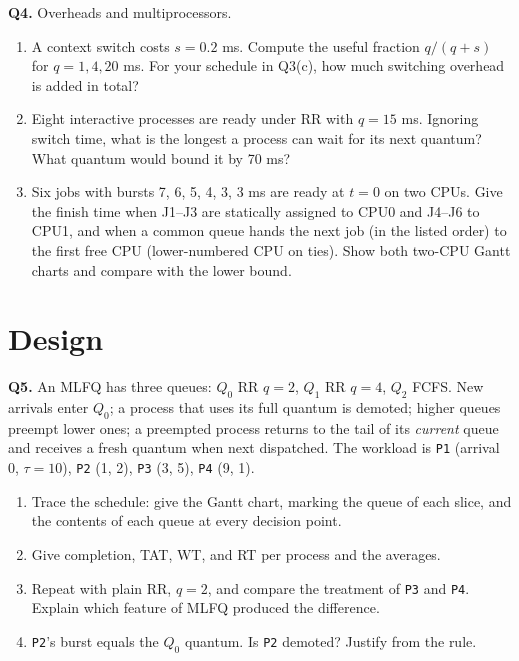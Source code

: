 \documentclass[11pt]{article}
\begin{document}
\textbf{Q4.} Overheads and multiprocessors.
\begin{enumerate}
  \item[(a)] A context switch costs $s = 0.2$ ms. Compute the useful fraction $q/(q+s)$ for $q = 1, 4, 20$ ms. For your schedule in Q3(c), how much switching overhead is added in total?
  \item[(b)] Eight interactive processes are ready under RR with $q = 15$ ms. Ignoring switch time, what is the longest a process can wait for its next quantum? What quantum would bound it by 70 ms?
  \item[(c)] Six jobs with bursts 7, 6, 5, 4, 3, 3 ms are ready at $t=0$ on two CPUs. Give the finish time when J1--J3 are statically assigned to CPU0 and J4--J6 to CPU1, and when a common queue hands the next job (in the listed order) to the first free CPU (lower-numbered CPU on ties). Show both two-CPU Gantt charts and compare with the lower bound.
\end{enumerate}

\section{Design}

\textbf{Q5.} An MLFQ has three queues: $Q_0$ RR $q=2$, $Q_1$ RR $q=4$, $Q_2$ FCFS. New arrivals enter $Q_0$; a process that uses its full quantum is demoted; higher queues preempt lower ones; a preempted process returns to the tail of its \emph{current} queue and receives a fresh quantum when next dispatched. The workload is \texttt{P1} (arrival 0, $\tau=10$), \texttt{P2} (1, 2), \texttt{P3} (3, 5), \texttt{P4} (9, 1).
\begin{enumerate}
  \item[(a)] Trace the schedule: give the Gantt chart, marking the queue of each slice, and the contents of each queue at every decision point.
  \item[(b)] Give completion, TAT, WT, and RT per process and the averages.
  \item[(c)] Repeat with plain RR, $q=2$, and compare the treatment of \texttt{P3} and \texttt{P4}. Explain which feature of MLFQ produced the difference.
  \item[(d)] \texttt{P2}'s burst equals the $Q_0$ quantum. Is \texttt{P2} demoted? Justify from the rule.
\end{enumerate}
\end{document}
